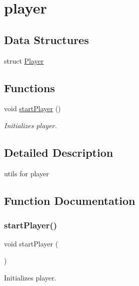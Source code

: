 \hypertarget{group__player}{}\section{player}
\label{group__player}
\subsection*{Data Structures}
\begin{DoxyCompactItemize}
\item 
struct \mbox{\hyperlink{struct_player}{Player}}
\end{DoxyCompactItemize}
\subsection*{Functions}
\begin{DoxyCompactItemize}
\item 
void \mbox{\hyperlink{group__player_gaee94db5fedae28c554588232013a5536}{start\+Player}} ()
\begin{DoxyCompactList}\small\item\em Initializes player. \end{DoxyCompactList}\end{DoxyCompactItemize}


\subsection{Detailed Description}
utils for player 

\subsection{Function Documentation}
\mbox{\label{group__player_gaee94db5fedae28c554588232013a5536}} 
\subsubsection{\texorpdfstring{startPlayer()}{startPlayer()}}
{\footnotesize\ttfamily void start\+Player (\begin{DoxyParamCaption}{ }\end{DoxyParamCaption})}



Initializes player. 

